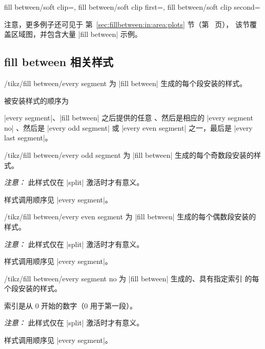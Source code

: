 \begin{tikzkeylist}{%
    fill between/soft clip=,
    fill between/soft clip first=,
    fill between/soft clip second=%
}
\begin{codeexample}[]
\end{codeexample}

    注意，更多例子还可见于
    第~\ref{sec:fillbetween:in:area:plots} 节（第~\pageref{sec:fillbetween:in:area:plots} 页），
    该节覆盖区域图，并包含大量 |fill between| 示例。
\end{tikzkeylist}


\subsection{fill between 相关样式}

\begin{stylekey}{/tikz/fill between/every segment}
    为 |fill between| 生成的每个段安装的样式。

    被安装样式的顺序为

    |every segment|、| fill between| 之后提供的任意
    、然后是相应的 |every segment no| 、然后是
    |every odd segment| 或 |every even segment| 之一，最后是
    |every last segment|。
\end{stylekey}

\begin{stylekey}{/tikz/fill between/every odd segment}
    为 |fill between| 生成的每个奇数段安装的样式。

    \emph{注意：} 此样式仅在 |split| 激活时才有意义。

    样式调用顺序见 |every segment|。
\end{stylekey}

\begin{stylekey}{/tikz/fill between/every even segment}
    为 |fill between| 生成的每个偶数段安装的样式。

    \emph{注意：} 此样式仅在 |split| 激活时才有意义。

    样式调用顺序见 |every segment|。
\end{stylekey}

\begin{stylekey}{/tikz/fill between/every segment no }
%
%
%
%
%
%
    为 |fill between| 生成的、具有指定索引  的每个段安装的样式。

    索引是从 $0$ 开始的数字（$0$ 用于第一段）。

    \emph{注意：} 此样式仅在 |split| 激活时才有意义。

    样式调用顺序见 |every segment|。
\end{stylekey}

